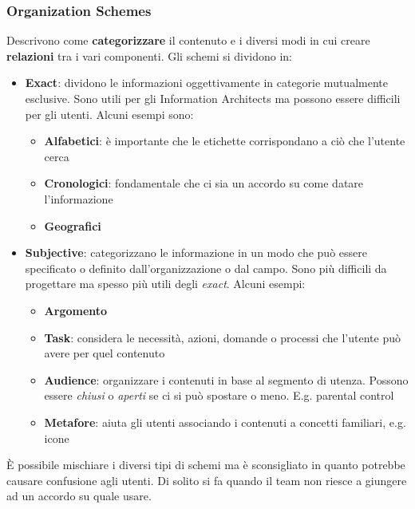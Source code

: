 \subsubsection{Organization Schemes}
Descrivono come \textbf{categorizzare} il contenuto e i diversi modi in cui creare \textbf{relazioni} tra i vari componenti. Gli schemi si dividono in:
\begin{itemize}
	\item \textbf{Exact}: dividono le informazioni oggettivamente in categorie mutualmente esclusive. Sono utili per gli Information Architects ma possono essere difficili per gli utenti. Alcuni esempi sono:
	\begin{itemize}
		\item \textbf{Alfabetici}: è importante che le etichette corrispondano a ciò che l'utente cerca
		\item \textbf{Cronologici}: fondamentale che ci sia un accordo su come datare l'informazione
		\item \textbf{Geografici}
	\end{itemize}
	\item \textbf{Subjective}: categorizzano le informazione in un modo che può essere specificato o definito dall'organizzazione o dal campo. Sono più difficili da progettare ma spesso più utili degli \textit{exact}. Alcuni esempi:
	\begin{itemize}
		\item \textbf{Argomento}
		\item \textbf{Task}: considera le necessità, azioni, domande o processi che l'utente può avere per quel contenuto
		\item \textbf{Audience}: organizzare i contenuti in base al segmento di utenza. Possono essere \textit{chiusi} o \textit{aperti} se ci si può spostare o meno. E.g. parental control
		\item \textbf{Metafore}: aiuta gli utenti associando i contenuti a concetti familiari, e.g. icone
	\end{itemize}
\end{itemize}
\begin{note}[Ibridi]
	È possibile mischiare i diversi tipi di schemi ma è sconsigliato in quanto potrebbe causare confusione agli utenti. Di solito si fa quando il team non riesce a giungere ad un accordo su quale usare.
\end{note}

